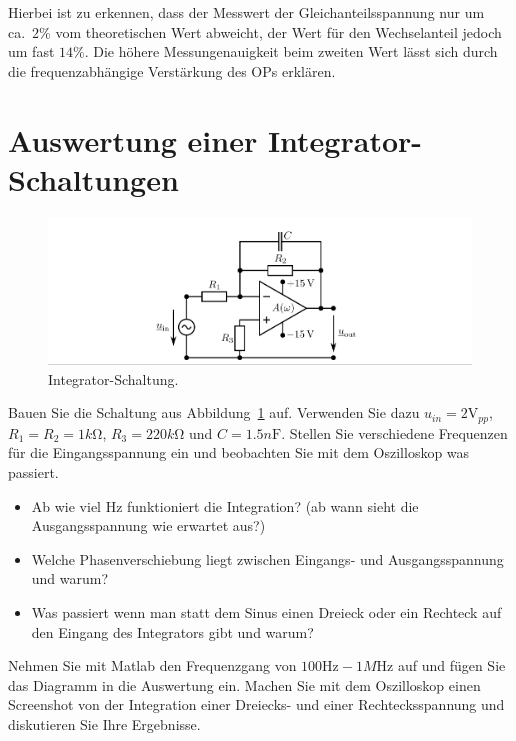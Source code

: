 \documentclass[10pt]{scrreprt}
\begin{document}
    Hierbei ist zu erkennen, dass der Messwert der Gleichanteilsspannung nur um
    ca.~$2\%$ vom theoretischen Wert abweicht, der Wert für den Wechselanteil jedoch
    um fast $14\%$. Die höhere Messungenauigkeit beim zweiten Wert lässt sich durch
    die frequenzabhängige Verstärkung des OPs erklären.

    \section{Auswertung einer Integrator-Schaltungen}
    \begin{center}
        \begin{figure}[H]
            \includegraphics[width=\textwidth]{abb15.png}
            \caption{Integrator-Schaltung.}
            \label{fig:abb15}
        \end{figure}
    \end{center}
    Bauen Sie die Schaltung aus Abbildung~\ref{fig:abb15} auf.
    Verwenden Sie dazu $u_{in} = 2\si{\volt}_{pp}$, $R_1 = R_2 = 1\si{k\ohm}$, $R_3 = 220\si{k\ohm}$ und $C = 1.5\si{n\farad}$.
    Stellen Sie verschiedene Frequenzen für die Eingangsspannung ein und beobachten Sie
    mit dem Oszilloskop was passiert.
    \begin{itemize}
        \item Ab wie viel Hz funktioniert die Integration? (ab wann sieht die Ausgangsspannung
            wie erwartet aus?)
        \item Welche Phasenverschiebung liegt zwischen Eingangs- und Ausgangsspannung und
            warum?
        \item Was passiert wenn man statt dem Sinus einen Dreieck oder ein Rechteck auf den
            Eingang des Integrators gibt und warum?
    \end{itemize}
    Nehmen Sie mit Matlab den Frequenzgang von $100\si{\hertz} - 1\si{M\hertz}$ auf und fügen Sie das
    Diagramm in die Auswertung ein.
    Machen Sie mit dem Oszilloskop einen Screenshot von der Integration einer Dreiecks- und
    einer Rechtecksspannung und diskutieren Sie Ihre Ergebnisse.
\end{document}
